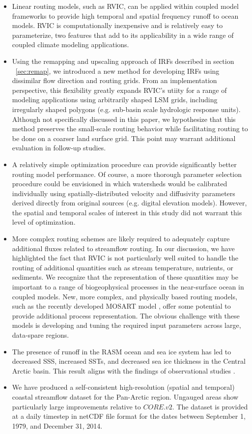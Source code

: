 \begin{itemize}
  \item Linear routing models, such as RVIC, can be applied within coupled model frameworks to provide high temporal and spatial frequency runoff to ocean models.
  RVIC is computationally inexpensive and is relatively easy to parameterize, two features that add to its applicability in a wide range of coupled climate modeling applications.
  \item Using the remapping and upscaling approach of IRFs described in section ~\ref{sec:remap}, we introduced a new method for developing IRFs using dissimilar flow direction and routing grids.
  From an implementation perspective, this flexibility greatly expands RVIC's utiity for a range of modeling applications using arbitrarily shaped LSM grids, including irregularly shaped polygons (e.g. sub-basin scale hydrologic response units).
  Although not specifically discussed in this paper, we hypothesize that this method preserves the small-scale routing behavior while facilitating routing to be done on a coarser land surface grid.
  This point may warrant additional evaluation in follow-up studies.
  \item A relatively simple optimization procedure can provide significantly better routing model performance.
  Of course, a more thorough parameter selection procedure could be envisioned in which watersheds would be calibrated individually using spatially-distributed velocity and diffusivity parameters derived directly from original sources (e.g. digital elevation models).
  However, the spatial and temporal scales of interest in this study did not warrant this level of optimization.
  \item More complex routing schemes are likely required to adequately capture additional fluxes related to streamflow routing.
  In our discussion, we have highlighted the fact that RVIC is not particularly well suited to handle the routing of additional quantities such as stream temperature, nutrients, or sediments.
  We recognize that the representation of these quantities may be important to a range of biogeophysical processes in the near-surface ocean in coupled models.
  New, more complex, and physically based routing models, such as the recently developed MOSART model \citep{Li_2013}, offer some potential to provide additional process representation.
  The obvious challenge with these models is developing and tuning the required input parameters across large, data-spare regions.
  \item The presence of runoff in the RASM ocean and sea ice system has led to decreased SSS, increased SSTs, and decreased sea ice thickness in the Central Arctic basin.
  This result aligns with the findings of observational studies \citep[e.g.][]{Morison_2012}.
  \item We have produced a self-consistent high-resolution (spatial and temporal) coastal streamflow dataset for the Pan-Arctic region.
  Ungauged areas show particularly large improvements relative to $CORE.v2$.
  The dataset is provided at a daily timestep in netCDF file format for the dates between September 1, 1979, and December 31, 2014.
\end{itemize}

